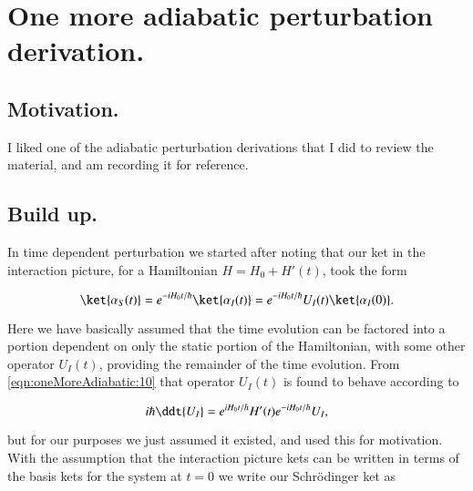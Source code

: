 %
%

\chapter{One more adiabatic perturbation derivation.}
\label{chap:oneMoreAdiabatic}
{}
\date{Dec 8, 2011}

\beginArtWithToc

\section{Motivation.}

I liked one of the adiabatic perturbation derivations that I did to review the material, and am recording it for reference.

\section{Build up.}

In time dependent perturbation we started after noting that our ket in the interaction picture, for a Hamiltonian $H = H_0 + H'(t)$, took the form

\begin{equation}\label{eqn:oneMoreAdiabatic:10}
\ket{\alpha_S(t)} 
= e^{-i H_0 t/\hbar} \ket{\alpha_I(t)} = e^{-i H_0 t/\hbar} U_I(t) \ket{\alpha_I(0)}.
\end{equation}

Here we have basically assumed that the time evolution can be factored into a portion dependent on only the static portion of the Hamiltonian, with some other operator $U_I(t)$, providing the remainder of the time evolution.  From \ref{eqn:oneMoreAdiabatic:10} that operator $U_I(t)$ is found to behave according to

\begin{equation}\label{eqn:oneMoreAdiabatic:30}
i \hbar \ddt{U_I} = e^{i H_0 t/\hbar} H'(t) e^{-i H_0 t/\hbar} U_I,
\end{equation}

but for our purposes we just assumed it existed, and used this for motivation.  With the assumption that the interaction picture kets can be written in terms of the basis kets for the system at $t=0$ we write our Schr\"{o}dinger ket as 

